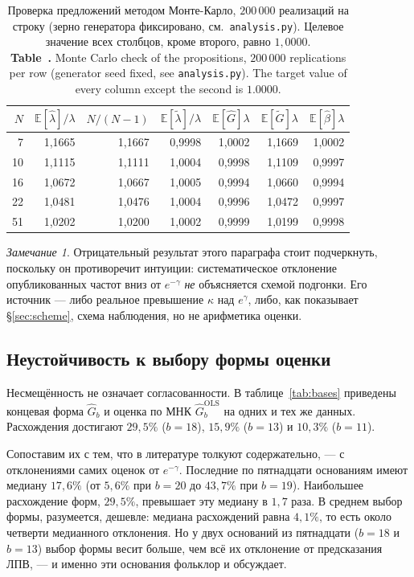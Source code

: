 \documentclass[11pt,a4paper]{article}
\newcommand{\encaptab}[1]{\\[3pt]\foreignlanguage{english}{%
  \textbf{Table~\thetable.} #1}}
\theoremstyle{plain}
\theoremstyle{remark}
\newtheorem{remark}{Замечание}
\newcommand{\eg}{e^{\gamma}}
\newcommand{\emg}{e^{-\gamma}}
\begin{document}
\begin{table}[t]
\centering
\caption{Проверка предложений методом Монте-Карло, $200\,000$ реализаций на строку
(зерно генератора фиксировано, см.\ \texttt{analysis.py}).
Целевое значение всех столбцов, кроме второго, равно $1{,}0000$.
\encaptab{Monte Carlo check of the propositions, $200\,000$ replications per row
(generator seed fixed, see \texttt{analysis.py}). The target value of every column
except the second is $1.0000$.}}
\label{tab:mc}
\small
\begin{tabular}{rrrrrrr}
\toprule
$N$ & $\mathbb E[\hat\lambda]/\lambda$ & $N/(N-1)$ & $\mathbb E[\tilde\lambda]/\lambda$
& $\mathbb E[\hat G]\lambda$ & $\mathbb E[\tilde G]\lambda$ & $\mathbb E[\hat\beta]\lambda$\\
\midrule
7 & 1{,}1665 & 1{,}1667 & 0{,}9998 & 1{,}0002 & 1{,}1669 & 1{,}0002\\
10 & 1{,}1115 & 1{,}1111 & 1{,}0004 & 0{,}9998 & 1{,}1109 & 0{,}9997\\
16 & 1{,}0672 & 1{,}0667 & 1{,}0005 & 0{,}9994 & 1{,}0660 & 0{,}9994\\
22 & 1{,}0481 & 1{,}0476 & 1{,}0004 & 0{,}9996 & 1{,}0472 & 0{,}9997\\
51 & 1{,}0202 & 1{,}0200 & 1{,}0002 & 0{,}9999 & 1{,}0199 & 0{,}9998\\
\bottomrule
\end{tabular}
\end{table}

\begin{remark}
Отрицательный результат этого параграфа стоит подчеркнуть, поскольку он противоречит
интуиции: систематическое отклонение опубликованных частот вниз от $\emg$
\emph{не} объясняется схемой подгонки. Его источник --- либо реальное превышение
$\kappa$ над $\eg$, либо, как показывает \S\ref{sec:scheme}, схема наблюдения,
но не арифметика оценки.
\end{remark}

\subsection{Неустойчивость к выбору формы оценки}\label{sec:instability}

Несмещённость не означает согласованности. В таблице~\ref{tab:bases} приведены
концевая форма $\hat G_b$ и оценка по МНК $\hat G_b^{\mathrm{OLS}}$ на одних и тех же
данных. Расхождения достигают $29{,}5\%$ ($b=18$), $15{,}9\%$ ($b=13$) и $10{,}3\%$
($b=11$).

Сопоставим их с тем, что в литературе толкуют содержательно, --- с отклонениями
самих оценок от $\emg$. Последние по пятнадцати основаниям имеют медиану $17{,}6\%$
(от $5{,}6\%$ при $b=20$ до $43{,}7\%$ при $b=19$). Наибольшее расхождение форм,
$29{,}5\%$, превышает эту медиану в $1{,}7$ раза. В среднем выбор формы, разумеется,
дешевле: медиана расхождений равна $4{,}1\%$, то есть около четверти медианного
отклонения. Но у двух оснований из пятнадцати ($b=18$ и $b=13$) выбор формы весит
больше, чем всё их отклонение от предсказания ЛПВ, --- и именно эти основания
фольклор и обсуждает.
\end{document}
